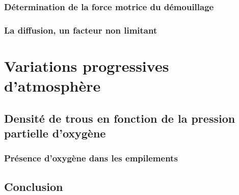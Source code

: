 			\subsubsection{Détermination de la force motrice du démouillage}
			\subsubsection{La diffusion, un facteur non limitant}
\section{Variations progressives d'atmosphère}
	\subsection{Densité de trous en fonction de la pression partielle d'oxygène}
	\subsubsection{Présence d'oxygène dans les empilements}
\subsection{Conclusion}
		
